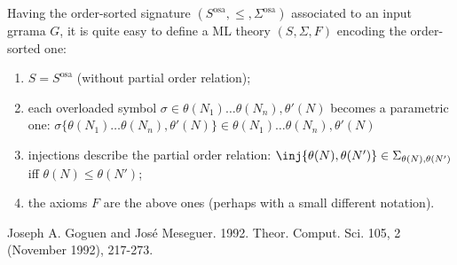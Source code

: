 \documentclass{article}
\theoremstyle{definition}
\theoremstyle{definition}
\theoremstyle{definition}
\theoremstyle{theorem}
\theoremstyle{theorem}
\theoremstyle{theorem}
\begin{document}
{Having the order-sorted signature $(S^\textrm{osa},\le, \Sigma^\textrm{osa})$ associated to an input grrama $G$, it is quite easy to define a ML theory $(S,\Sigma, F)$ encoding the order-sorted one:
\begin{enumerate}
\item $S=S^\textrm{osa}$ (without partial order relation);
\item each overloaded symbol $\sigma\in \theta(N_1)\ldots\theta(N_n), \theta'(N)$ becomes a parametric one: $\sigma\{\theta(N_1)\ldots\theta(N_n), \theta'(N)\}\in \theta(N_1)\ldots\theta(N_n), \theta'(N)$
\item injections describe the partial order relation: $\inj\{\theta(N),\theta(N')\}\in\Sigma_{\theta(N),\theta(N')}$ iff $\theta(N)\le \theta(N')$;
\item the axioms $F$ are the above ones (perhaps with a small different notation).
\end{enumerate}
}

\begin{thebibliography}{ABC99a}

Joseph A. Goguen and José Meseguer. 1992. 
\newblock Theor. Comput. Sci. 105, 2 (November 1992), 217-273.

\end{thebibliography}
\end{document}
